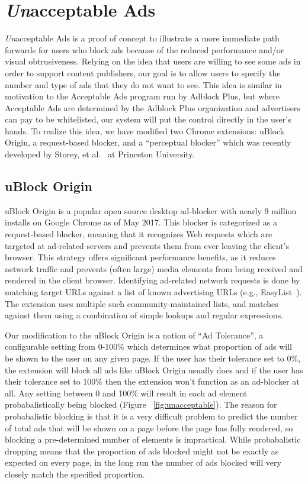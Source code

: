 \section{\textit{Un}acceptable Ads}
\textit{Un}acceptable Ads is a proof of concept to illustrate a more immediate path forwards for users who block ads because of the reduced performance and/or visual obtrusiveness.
Relying on the idea that users are willing to see some ads in order to support content publishers, our goal is to allow users to specify the number and type of ads that they do not want to see.
This idea is similar in motivation to the Acceptable Ads program run by Adblock Plus, but where Acceptable Ads are determined by the Adblock Plus organization and advertisers can pay to be whitelisted, our system will put the control directly in the user's hands.
To realize this idea, we have modified two Chrome extensions: uBlock Origin, a request-based blocker, and a ``perceptual blocker'' which was recently developed by Storey, et al.~\cite{storey2016future} at Princeton University.

\subsection{uBlock Origin}
uBlock Origin is a popular open source desktop ad-blocker with nearly 9 million installs on Google Chrome as of May 2017.
This blocker is categorized as a request-based blocker, meaning that it recognizes Web requests which are targeted at ad-related servers and prevents them from ever leaving the client's browser.
This strategy offers significant performance benefits, as it reduces network traffic and prevents (often large) media elements from being received and rendered in the client browser.
Identifying ad-related network requests is done by matching target URLs against a list of known advertising URLs (e.g., EasyList~\cite{easylist}).
The extension uses multiple such community-maintained lists, and matches against them using a combination of simple lookups and regular expressions.

Our modification to the uBlock Origin is a notion of ``Ad Tolerance'', a configurable setting from 0-100\% which determines what proportion of ads will be shown to the user on any given page.
If the user has their tolerance set to 0\%, the extension will block all ads like uBlock Origin usually does and if the user has their tolerance set to 100\% then the extension won't function as an ad-blocker at all.
Any setting between 0 and 100\% will result in each ad element probabalistically being blocked (Figure ~\ref{fig:unacceptable}).
The reason for probabalistic blocking is that it is a very difficult problem to predict the number of total ads that will be shown on a page before the page has fully rendered, so blocking a pre-determined number of elements is impractical.
While probabalistic dropping means that the proportion of ads blocked might not be exactly as expected on every page, in the long run the number of ads blocked will very closely match the specified proportion.


